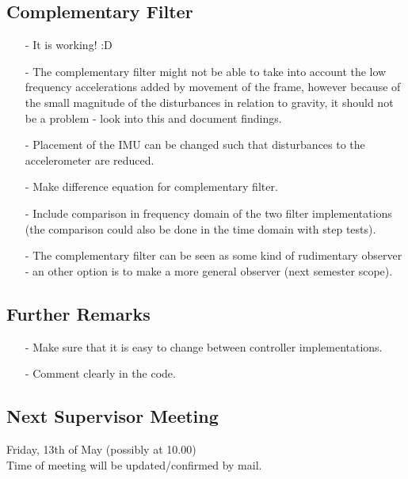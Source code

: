 \subsection{Complementary Filter}
\begin{itemize}
  \item[-] It is working! :D
  \item[-] The complementary filter might not be able to take into account the low frequency accelerations added by movement of the frame, however because of the small magnitude of the disturbances in relation to gravity, it should not be a problem - look into this and document findings.
  \item[-] Placement of the IMU can be changed such that disturbances to the accelerometer are reduced.
  \item[-] Make difference equation for complementary filter.
  \item[-] Include comparison in frequency domain of the two filter implementations (the comparison could also be done in the time domain with step tests).
  \item[-] The complementary filter can be seen as some kind of rudimentary observer - an other option is to make a more general observer (next semester scope).
\end{itemize}

\subsection{Further Remarks}
\begin{itemize}
  \item[-] Make sure that it is easy to change between controller implementations.
  \item[-] Comment clearly in the code.
\end{itemize}

\subsection{Next Supervisor Meeting}
Friday, 13th of May (possibly at 10.00)\\
Time of meeting will be updated/confirmed by mail.


